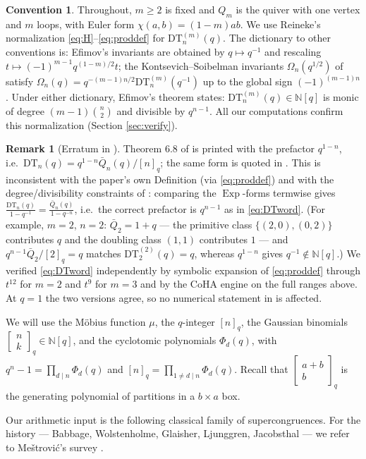 \documentclass[11pt]{amsart}
\theoremstyle{definition}
\newtheorem{remark}[theorem]{Remark}
\newtheorem{convention}[theorem]{Convention}
\newcommand{\NN}{\mathbb{N}}
\newcommand{\DT}{\mathrm{DT}}
\newcommand{\Exp}{\operatorname{Exp}}
\newcommand{\qbin}[2]{\begin{bmatrix}#1\\#2\end{bmatrix}_q}
\begin{document}
\begin{convention}\label{conv:DT}
Throughout, $m\ge2$ is fixed and $Q_m$ is the quiver with one vertex and $m$ loops, with Euler form $\chi(a,b)=(1-m)ab$. We use Reineke's normalization \eqref{eq:H}--\eqref{eq:proddef} for $\DT^{(m)}_n(q)$. The dictionary to other conventions is: Efimov's invariants \cite[\S4]{Efimov} are obtained by $q\mapsto q^{-1}$ and rescaling $t\mapsto (-1)^{m-1}q^{(1-m)/2}t$; the Kontsevich--Soibelman invariants $\Omega_n(q^{1/2})$ of \cite[\S2.5]{KS} satisfy $\Omega_n(q)=q^{-(m-1)n/2}\DT^{(m)}_n(q^{-1})$ up to the global sign $(-1)^{(m-1)n}$. Under either dictionary, Efimov's theorem \cite{Efimov} states: $\DT^{(m)}_n(q)\in\NN[q]$ is monic of degree $(m-1)\binom n2$ and divisible by $q^{n-1}$. All our computations confirm this normalization (Section \ref{sec:verify}).
\end{convention}

\begin{remark}[Erratum in {\cite[Thm.~6.8]{Rei1102}}]\label{rem:erratum}
Theorem 6.8 of \cite{Rei1102} is printed with the prefactor $q^{1-n}$, i.e.\ $\DT_n(q)=q^{1-n}\bar Q_n(q)/[n]_q$; the same form is quoted in \cite[eq.~(B.4)]{KuchSulk}. This is inconsistent with the paper's own Definition (via \eqref{eq:proddef}) and with the degree/divisibility constraints of \cite[Cor.~4.2]{Efimov}: comparing the $\Exp$-forms termwise gives $\frac{\DT_n(q)}{1-q^{-1}}=\frac{\bar Q_n(q)}{1-q^{-n}}$, i.e.\ the correct prefactor is $q^{n-1}$ as in \eqref{eq:DTword}. (For example, $m=2$, $n=2$: $\bar Q_2=1+q$ --- the primitive class $\{(2,0),(0,2)\}$ contributes $q$ and the doubling class $(1,1)$ contributes $1$ --- and $q^{n-1}\bar Q_2/[2]_q= q$ matches $\DT^{(2)}_2(q)=q$, whereas $q^{1-n}$ gives $q^{-1}\notin\NN[q]$.) We verified \eqref{eq:DTword} independently by symbolic expansion of \eqref{eq:proddef} through $t^{12}$ for $m=2$ and $t^9$ for $m=3$ and by the CoHA engine on the full ranges above. At $q=1$ the two versions agree, so no numerical statement in \cite{Rei1102} is affected.
\end{remark}

We will use the M\"obius function $\mu$, the $q$-integer $[n]_q$, the Gaussian binomials $\qbin nk\in\NN[q]$, and the cyclotomic polynomials $\Phi_d(q)$, with $q^n-1=\prod_{d\mid n}\Phi_d(q)$ and $[n]_q=\prod_{1\ne d\mid n}\Phi_d(q)$. Recall that $\qbin{a+b}{b}$ is the generating polynomial of partitions in a $b\times a$ box.

Our arithmetic input is the following classical family of supercongruences. For the history --- Babbage, Wolstenholme, Glaisher, Ljunggren, Jacobsthal --- we refer to Me\v strovi\'c's survey \cite{Mestrovic}.
\end{document}

